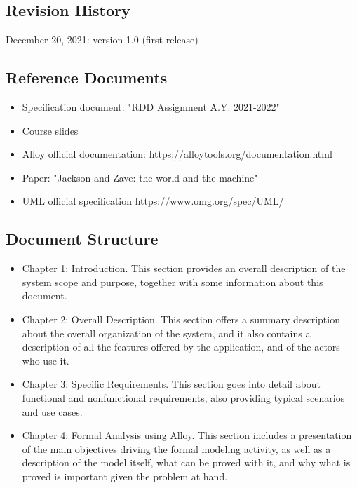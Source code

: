 \documentclass{article}
\begin{document}
\subsection{Revision History}
December 20, 2021: version 1.0 (first release)

\subsection{Reference Documents}
    \begin{itemize}
        \item Specification document: "RDD Assignment A.Y. 2021-2022"
        \item Course slides
        \item Alloy official documentation: https://alloytools.org/documentation.html
        \item Paper: "Jackson and Zave: the world and the machine"
        \item UML official specification https://www.omg.org/spec/UML/
    \end{itemize}


\newpage

\subsection{Document Structure}
    \begin{itemize}
        \item Chapter 1: Introduction. This section provides an overall description of the system scope and purpose, together with some information about this document.

        \item Chapter 2: Overall Description. This section offers a summary description about the overall organization of the system, and it also contains a description of all the features offered by the application, and of the actors who use it.

        \item Chapter 3: Specific Requirements. This section goes into detail about functional and nonfunctional requirements, also providing typical scenarios and use cases.

        \item Chapter 4: Formal Analysis using Alloy. This section includes a presentation of the main objectives driving the formal modeling activity, as well as a description of the model itself, what can be proved with it, and why what is proved is important given the problem at hand.
    \end{itemize}
\end{document}
